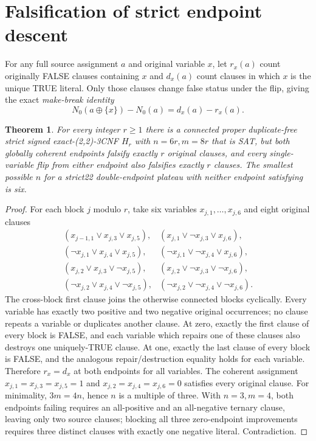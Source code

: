 \documentclass[11pt]{article}
\newtheorem{theorem}{Theorem}
\begin{document}
\section{Falsification of strict endpoint descent}
For any full source assignment $a$ and original variable $x$, let $r_x(a)$ count originally FALSE clauses containing $x$ and $d_x(a)$ count clauses in which $x$ is the unique TRUE literal. Only those clauses change false status under the flip, giving the exact \emph{make-break identity}
\[
N_0(a\oplus\{x\})-N_0(a)=d_x(a)-r_x(a).
\]
\begin{theorem}
For every integer $r\ge1$ there is a connected proper duplicate-free strict signed exact-(2,2)-3CNF $H_r$ with $n=6r,m=8r$ that is SAT, but both globally coherent endpoints falsify exactly $r$ original clauses, and every single-variable flip from either endpoint also falsifies exactly $r$ clauses. The smallest possible $n$ for a strict22 double-endpoint plateau with neither endpoint satisfying is six.
\end{theorem}
\begin{proof}
For each block $j$ modulo $r$, take six variables $x_{j,1},\ldots,x_{j,6}$ and eight original clauses
\[
\begin{array}{ll}
(x_{j-1,1}\vee x_{j,3}\vee x_{j,5}),&(x_{j,1}\vee\neg x_{j,3}\vee x_{j,6}),\\
(\neg x_{j,1}\vee x_{j,4}\vee x_{j,5}),&(\neg x_{j,1}\vee\neg x_{j,4}\vee x_{j,6}),\\
(x_{j,2}\vee x_{j,3}\vee\neg x_{j,5}),&(x_{j,2}\vee\neg x_{j,3}\vee\neg x_{j,6}),\\
(\neg x_{j,2}\vee x_{j,4}\vee\neg x_{j,5}),&(\neg x_{j,2}\vee\neg x_{j,4}\vee\neg x_{j,6}).
\end{array}
\]
The cross-block first clause joins the otherwise connected blocks cyclically. Every variable has exactly two positive and two negative original occurrences; no clause repeats a variable or duplicates another clause. At zero, exactly the first clause of every block is FALSE, and each variable which repairs one of these clauses also destroys one uniquely-TRUE clause. At one, exactly the last clause of every block is FALSE, and the analogous repair/destruction equality holds for each variable. Therefore $r_x=d_x$ at both endpoints for all variables. The coherent assignment $x_{j,1}=x_{j,3}=x_{j,5}=1$ and $x_{j,2}=x_{j,4}=x_{j,6}=0$ satisfies every original clause. For minimality, $3m=4n$, hence $n$ is a multiple of three. With $n=3,m=4$, both endpoints failing requires an all-positive and an all-negative ternary clause, leaving only two source clauses; blocking all three zero-endpoint improvements requires three distinct clauses with exactly one negative literal. Contradiction.
\end{proof}
\end{document}
